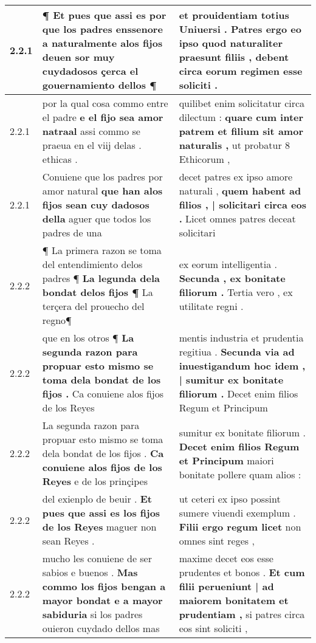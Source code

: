 \begin{tabular}{|p{1cm}|p{6.5cm}|p{6.5cm}|}
2.2.1 & ¶ Et pues que assi es por que los padres enssenore a naturalmente \textbf{ alos fijos deuen sor muy } cuydadosos çerca el gouernamiento dellos ¶ & et prouidentiam totius Uniuersi . \textbf{ Patres ergo eo ipso quod naturaliter praesunt filiis , } debent circa eorum regimen esse soliciti . \\\hline
2.2.1 & por la qual cosa commo entre el padre \textbf{ e el fijo sea amor natraal } assi commo se praeua en el viij delas . ethicas . & quilibet enim solicitatur circa dilectum : \textbf{ quare cum inter patrem et filium sit amor naturalis , } ut probatur 8 Ethicorum , \\\hline
2.2.1 & Conuiene que los padres por amor natural \textbf{ que han alos fijos sean cuy dadosos della } aguer que todos los padres de una & decet patres ex ipso amore naturali , \textbf{ quem habent ad filios , | solicitari circa eos . } Licet omnes patres deceat solicitari \\\hline
2.2.2 & ¶ La primera razon se toma del entendimiento delos padres ¶ \textbf{ La legunda dela bondat delos fijos ¶ } La terçera del prouecho del regno¶ & ex eorum intelligentia . \textbf{ Secunda , ex bonitate filiorum . } Tertia vero , ex utilitate regni . \\\hline
2.2.2 & que en los otros ¶ \textbf{ La segunda razon para propuar esto mismo se toma dela bondat de los fijos . } Ca conuiene alos fijos de los Reyes & mentis industria et prudentia regitiua . \textbf{ Secunda via ad inuestigandum hoc idem , | sumitur ex bonitate filiorum . } Decet enim filios Regum et Principum \\\hline
2.2.2 & La segunda razon para propuar esto mismo se toma dela bondat de los fijos . \textbf{ Ca conuiene alos fijos de los Reyes } e de los prinçipes & sumitur ex bonitate filiorum . \textbf{ Decet enim filios Regum et Principum } maiori bonitate pollere quam alios : \\\hline
2.2.2 & del exienplo de beuir . \textbf{ Et pues que assi es los fijos de los Reyes } maguer non sean Reyes . & ut ceteri ex ipso possint sumere viuendi exemplum . \textbf{ Filii ergo regum licet } non omnes sint reges , \\\hline
2.2.2 & mucho les conuiene de ser sabios e buenos . \textbf{ Mas commo los fijos bengan a mayor bondat e a mayor sabiduria } si los padres ouieron cuydado dellos mas & maxime decet eos esse prudentes et bonos . \textbf{ Et cum filii perueniunt | ad maiorem bonitatem et prudentiam , } si patres circa eos sint soliciti , \\\hline

\end{tabular}

